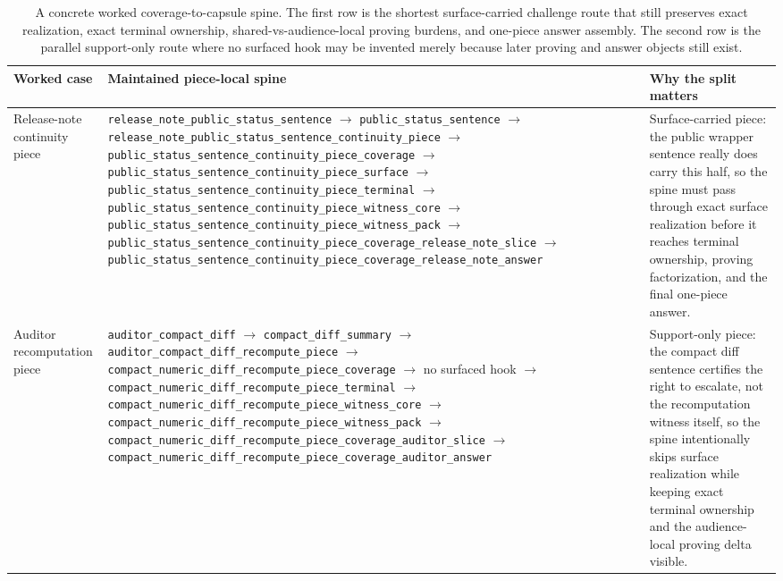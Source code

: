 \documentclass[11pt]{article}
\begin{document}
\begin{table}[t]
\centering
\small
\begin{tabularx}{\linewidth}{@{}Y Y Y@{}}
\toprule
Worked case & Maintained piece-local spine & Why the split matters \\
\midrule
Release-note continuity piece & \nolinkurl{release_note_public_status_sentence} $\to$ \nolinkurl{public_status_sentence} $\to$ \nolinkurl{release_note_public_status_sentence_continuity_piece} $\to$ \nolinkurl{public_status_sentence_continuity_piece_coverage} $\to$ \nolinkurl{public_status_sentence_continuity_piece_surface} $\to$ \nolinkurl{public_status_sentence_continuity_piece_terminal} $\to$ \nolinkurl{public_status_sentence_continuity_piece_witness_core} $\to$ \nolinkurl{public_status_sentence_continuity_piece_witness_pack} $\to$ \nolinkurl{public_status_sentence_continuity_piece_coverage_release_note_slice} $\to$ \nolinkurl{public_status_sentence_continuity_piece_coverage_release_note_answer} & Surface-carried piece: the public wrapper sentence really does carry this half, so the spine must pass through exact surface realization before it reaches terminal ownership, proving factorization, and the final one-piece answer. \\
Auditor recomputation piece & \nolinkurl{auditor_compact_diff} $\to$ \nolinkurl{compact_diff_summary} $\to$ \nolinkurl{auditor_compact_diff_recompute_piece} $\to$ \nolinkurl{compact_numeric_diff_recompute_piece_coverage} $\to$ no surfaced hook $\to$ \nolinkurl{compact_numeric_diff_recompute_piece_terminal} $\to$ \nolinkurl{compact_numeric_diff_recompute_piece_witness_core} $\to$ \nolinkurl{compact_numeric_diff_recompute_piece_witness_pack} $\to$ \nolinkurl{compact_numeric_diff_recompute_piece_coverage_auditor_slice} $\to$ \nolinkurl{compact_numeric_diff_recompute_piece_coverage_auditor_answer} & Support-only piece: the compact diff sentence certifies the right to escalate, not the recomputation witness itself, so the spine intentionally skips surface realization while keeping exact terminal ownership and the audience-local proving delta visible. \\
\bottomrule
\end{tabularx}
\caption{A concrete worked coverage-to-capsule spine. The first row is the shortest surface-carried challenge route that still preserves exact realization, exact terminal ownership, shared-vs-audience-local proving burdens, and one-piece answer assembly. The second row is the parallel support-only route where no surfaced hook may be invented merely because later proving and answer objects still exist.}
\label{tab:workedexample-coverage-to-capsule-spine}
\end{table}
\end{document}
